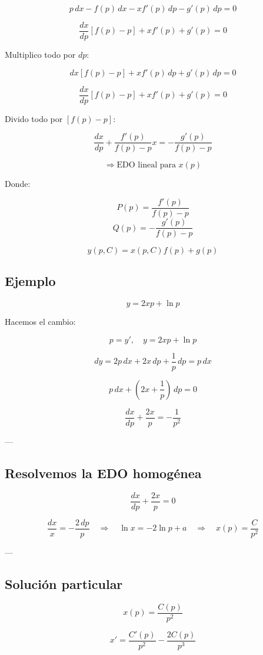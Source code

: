 \documentclass[a4paper,12pt]{article}
\begin{document}
\[
p\, dx - f(p)\, dx - x f'(p)\, dp - g'(p)\, dp = 0
\]

\[
\frac{dx}{dp} [f(p) - p] + x f'(p) + g'(p) = 0
\]

Multiplico todo por \(dp\):

\[
dx [f(p) - p] + x f'(p)\, dp + g'(p)\, dp = 0
\]

\[
\frac{dx}{dp} [f(p) - p] + x f'(p) + g'(p) = 0
\]

Divido todo por \([f(p) - p]\):

\[
\frac{dx}{dp} + \frac{f'(p)}{f(p) - p} x = - \frac{g'(p)}{f(p) - p}
\]

\[
\Rightarrow \text{EDO lineal para } x(p)
\]

Donde:

\[
P(p) = \frac{f'(p)}{f(p) - p}
\]
\[
Q(p) = -\frac{g'(p)}{f(p) - p}
\]

\[
y(p, C) = x(p, C) f(p) + g(p)
\]
\subsection*{Ejemplo}

\[
y = 2xp + \ln p
\]

Hacemos el cambio:

\[
p = y', \quad y = 2xp + \ln p
\]

\[
dy = 2p\, dx + 2x\, dp + \frac{1}{p}\, dp = p\, dx
\]

\[
p\, dx + (2x + \frac{1}{p})\, dp = 0
\]

\[
\frac{dx}{dp} + \frac{2x}{p} = -\frac{1}{p^2}
\]

---

\subsection*{Resolvemos la EDO homogénea}

\[
\frac{dx}{dp} + \frac{2x}{p} = 0
\]

\[
\frac{dx}{x} = -\frac{2\, dp}{p} 
\quad \Rightarrow \quad 
\ln x = -2 \ln p + a 
\quad \Rightarrow \quad 
x(p) = \frac{C}{p^2}
\]

---

\subsection*{Solución particular}

\[
x(p) = \frac{C(p)}{p^2}
\]

\[
x' = \frac{C'(p)}{p^2} - \frac{2C(p)}{p^3}
\]
\end{document}
